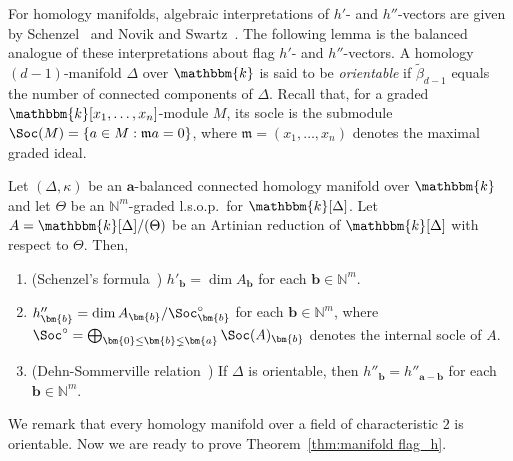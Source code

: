 For homology manifolds, algebraic interpretations of $h'$- and $h''$-vectors are given by Schenzel~\cite{Sch81} and Novik and Swartz~\cite{NS09}.
The following lemma is the balanced analogue of these interpretations about flag $h'$- and $h''$-vectors.
A homology $(d-1)$-manifold $\Delta$ over $\mathbbm{k}$ is said to be \emph{orientable} if $\widetilde{\beta}_{d-1}$ equals the number of connected components of $\Delta$.
Recall that, for a graded $\mathbbm{k}[x_1,\ldots,x_n]$-module $M$, its socle is the submodule $\Soc(M)=\{a \in M: \mathfrak{m}a=0\}$, where $\mathfrak{m}=(x_1,\ldots,x_n)$ denotes the maximal graded ideal.
\begin{lemma} \label{lem:flag h', h''}
Let $(\Delta,\kappa)$ be an $\bm{a}$-balanced connected homology manifold over $\mathbbm{k}$ and let $\Theta$ be an $\mathbb{N}^m$-graded l.s.o.p.~for $\mathbbm{k}[\Delta]$.
Let $A=\mathbbm{k}[\Delta]/(\Theta)$ be an Artinian reduction of $\mathbbm{k}[\Delta]$ with respect to $\Theta$. Then,
\begin{enumerate}
\item[(i)] (Schenzel's formula~\cite[Theorem 3.1]{JMNS}) $h'_{\bm{b}}=\dim A_{\bm{b}}$ for each $\bm{b} \in \mathbb{N}^m$.
\item[(ii)] \cite[Corollary 3.3]{JMNS} $h''_{\bm{b}}=\dim A_{\bm{b}}/\Soc^\circ_{\bm{b}}$ for each $\bm{b} \in \mathbb{N}^m$, where $\Soc^\circ=\bigoplus_{\bm{0} \leq \bm{b} \lneq \bm{a}}\Soc(A)_{\bm{b}}$ denotes the internal socle of $A$.
\item[(iii)] (Dehn-Sommerville relation~\cite[Theorem 4.1]{JMNS}) If $\Delta$ is orientable, then $h''_{\bm{b}}=h''_{\bm{a}-\bm{b}}$ for each $\bm{b} \in \mathbb{N}^m$.
\end{enumerate}
\end{lemma}
We remark that every homology manifold over a field of characteristic $2$ is orientable.
Now we are ready to prove Theorem~\ref{thm:manifold flag_h}.
